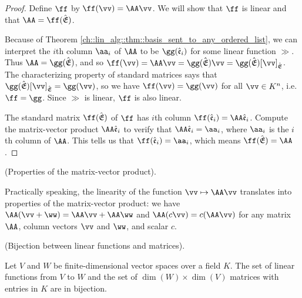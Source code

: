 \begin{proof}
    Define $\ff$ by $\ff(\vv) = \AA \vv$. We will show that $\ff$ is linear and that $\AA = \ff(\sE)$.

    Because of Theorem \ref{ch::lin_alg::thm::basis_sent_to_any_ordered_list}, we can interpret the $i$th column $\aa_i$ of $\AA$ to be $\gg(\see_i)$ for some linear function $\gg$. Thus $\AA = \gg(\sE)$, and so $\ff(\vv) = \AA \vv = \gg(\sE) \vv = \gg(\sE) [\vv]_\sE$. The characterizing property of standard matrices says that $\gg(\sE) [\vv]_\sE = \gg(\vv)$, so we have $\ff(\vv) = \gg(\vv)$ for all $\vv \in K^n$, i.e. $\ff = \gg$. Since $\gg$ is linear, $\ff$ is also linear.
    
    The standard matrix $\ff(\sE)$ of $\ff$ has $i$th column $\ff(\see_i) = \AA \see_i$. Compute the matrix-vector product $\AA \see_i$ to verify that $\AA \see_i = \aa_i$, where $\aa_i$ is the $i$th column of $\AA$. This tells us that $\ff(\see_i) = \aa_i$, which means $\ff(\sE) = \AA$.
    
\end{proof}

\begin{theorem}
    (Properties of the matrix-vector product).
    
    Practically speaking, the linearity of the function $\vv \mapsto \AA \vv$ translates into properties of the matrix-vector product: we have $\AA(\vv + \ww) = \AA \vv + \AA \ww$ and $\AA(c\vv) = c(\AA \vv)$ for any matrix $\AA$, column vectors $\vv$ and $\ww$, and scalar $c$. 
\end{theorem}

\begin{theorem}
    \label{ch::lin_alg::thm::linear_functions_matrices_bijection}
    (Bijection between linear functions and matrices).
    
    Let $V$ and $W$ be finite-dimensional vector spaces over a field $K$. The set of linear functions from $V$ to $W$ and the set of $\dim(W) \times \dim(V)$ matrices with entries in $K$ are in bijection.
\end{theorem}

